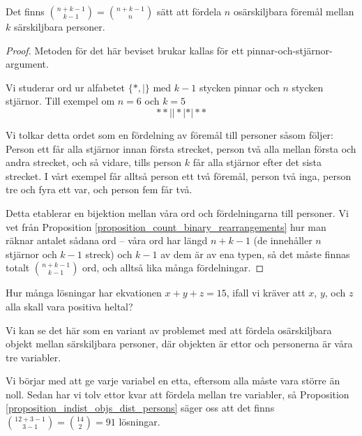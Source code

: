 \documentclass[nobib]{tufte-handout}
\begin{document}
\begin{proposition}\label{proposition_indist_objs_dist_persons}
  Det finns $\binom{n+k-1}{k-1} = \binom{n+k-1}{n}$ sätt att fördela $n$ osärskiljbara föremål mellan $k$ särskiljbara personer.

  \begin{proof}
    Metoden för det här beviset brukar kallas för ett pinnar-och-stjärnor-argument.

    Vi studerar ord ur alfabetet $\{*,|\}$ med $k-1$ stycken pinnar och $n$ stycken stjärnor. Till exempel om $n=6$ och $k=5$
    $$**||*|*|**$$

    Vi tolkar detta ordet som en fördelning av föremål till personer såsom följer: Person ett får alla  stjärnor innan första strecket, person två alla mellan första och andra strecket, och så vidare, tills person $k$ får alla stjärnor efter det sista strecket. I vårt exempel får alltså person ett två föremål, person två inga, person tre och fyra ett var, och person fem får två.

    Detta etablerar en bijektion mellan våra ord och fördelningarna till personer. Vi vet från Proposition \ref{proposition_count_binary_rearrangements} hur man räknar antalet sådana ord -- våra ord har längd $n + k -1$ (de innehåller $n$ stjärnor och $k-1$ streck) och $k-1$ av dem är av ena typen, så det måste finnas totalt $\binom{n + k - 1}{k - 1}$ ord, och alltså lika många fördelningar.
  \end{proof}
\end{proposition}

\begin{example}
  Hur många lösningar har ekvationen $x + y + z = 15$, ifall vi kräver att $x$, $y$, och $z$ alla skall vara positiva heltal?

  Vi kan se det här som en variant av problemet med att fördela osärskiljbara objekt mellan särskiljbara personer, där objekten är ettor och personerna är våra tre variabler. 
  
  Vi börjar med att ge varje variabel en etta, eftersom alla måste vara större än noll. Sedan har vi tolv ettor kvar att fördela mellan tre variabler, så Proposition \ref{proposition_indist_objs_dist_persons} säger oss att det finns $\binom{12 + 3 -1}{3 - 1} = \binom{14}{2} = 91$ lösningar.
\end{example}
\end{document}
